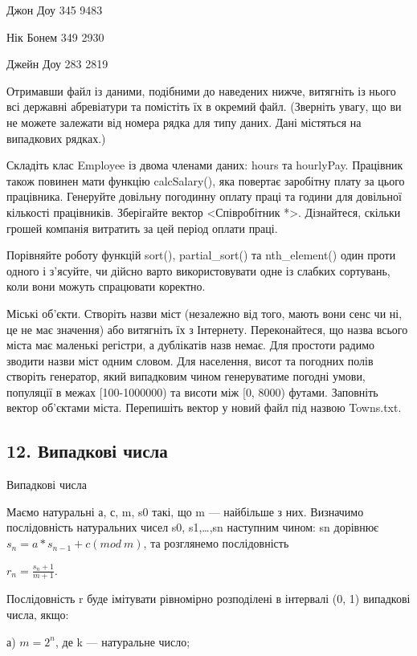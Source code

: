 \documentclass[]{article}
\begin{document}
Джон Доу 345 9483

Нік Бонем 349 2930

Джейн Доу 283 2819

Отримавши файл із даними, подібними до наведених нижче, витягніть із
нього всі державні абревіатури та помістіть їх в окремий файл. (Зверніть
увагу, що ви не можете залежати від номера рядка для типу даних. Дані
містяться на випадкових рядках.)

Складіть клас Employee із двома членами даних: hours та hourlyPay.
Працівник також повинен мати функцію calcSalary(), яка повертає
заробітну плату за цього працівника. Генеруйте довільну погодинну оплату
праці та години для довільної кількості працівників. Зберігайте вектор
\textless{}Співробітник *\textgreater{}. Дізнайтеся, скільки грошей
компанія витратить за цей період оплати праці.

Порівняйте роботу функцій sort(), partial\_sort() та nth\_element() один
проти одного і з'ясуйте, чи дійсно варто використовувати одне із слабких
сортувань, коли вони можуть спрацювати коректно.

Міські об'єкти. Створіть назви міст (незалежно від того, мають вони сенс
чи ні, це не має значення) або витягніть їх з Інтернету. Переконайтеся,
що назва всього міста має маленькі регістри, а дублікатів назв немає.
Для простоти радимо зводити назви міст одним словом. Для населення,
висот та погодних полів створіть генератор, який випадковим чином
генеруватиме погодні умови, популяції в межах {[}100-1000000) та висоти
між {[}0, 8000) футами. Заповніть вектор об'єктами міста. Перепишіть
вектор у новий файл під назвою Towns.txt.

\subsection{12. Випадкові
числа}\label{ux432ux438ux43fux430ux434ux43aux43eux432ux456-ux447ux438ux441ux43bux430}

Випадкові числа

Маємо натуральні а, с, m, s0 такі, що m --- найбільше з них. Визначимо
послідовність натуральних чисел s0, s1,\ldots{},sn наступним чином: sn
дорівнює \(s_{n} = a*s_{n - 1} + c(mod\ m)\), та розглянемо
послідовність

\(r_{n} = \frac{s_{n} + 1}{m + 1}\).

Послідовність r буде імітувати рівномірно розподілені в інтервалі (0, 1)
випадкові числа, якщо:

а) \({m = 2}^{n}\), де k --- натуральне число;
\end{document}
